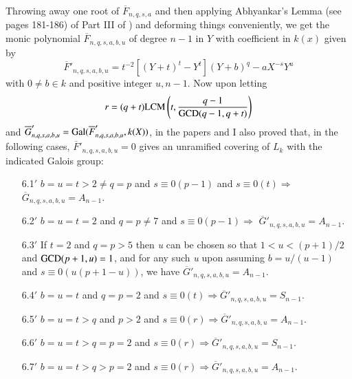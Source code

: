 Throwing away one root of $\overline{F}_{n,q,s,a}$ and then applying Abhyankar's Lemma (see pages 181-186) of Part III of \cite{art1-key4}) and deforming things conveniently, we get the monic polynomial $\overline{F}_{n,q,s,a,b,u}$ of degree $n-1$ in $Y$ with coefficient in $k(x)$ given by
$$
\overline{F}'_{n,q,s,a,b,u}=t^{-2}\left[(Y+t)^t-Y^{t}\right](Y+b)^q-aX^{-s}Y^{u}
$$
with $0 \neq b \in k$ and positive integer $u,n-1$. Now upon letting
$$
r=(q+t){\rm LCM} \left(t,\dfrac{q-1}{\operatorname{GCD} (q-1, q+t)}\right)
$$
and $\overline{G}'_{n,q,s,a,b,u} = \operatorname{Gal}(\overline{F}'_{n,q,s,a,b,u}, k(X))$, in the papers \cite{art1-key8} and \cite{art1-key10} I also proved that, in the following cases, $\overline{F}'_{n,q,s,a,b,u}=0$ gives an unramified covering of $L_{k}$ with the indicated Galois group:
\begin{itemize}
\item[{\rm 6.1$'$}]$b = u = t > 2 \neq q = p$ and $s \equiv 0(p-1)$ and $s \equiv 0(t) \Rightarrow$ $\overline{G}_{n,q,s,a,b,u} = A_{n-1}$.
\item[{\rm 6.2$'$}] $b = u = t = 2$ and $q = p \neq 7$ and $s\equiv 0(p-1) \Rightarrow$
 $\overline{G}'_{n,q,s,a,b,u} = A_{n-1}$.
\item[{\rm 6.3$'$ }] If $t =2$ and $q = p > 5$ then {\it u} can be chosen so that $1<u<(p+1)/2$ 
and $\operatorname{GCD}(p+1,u)=1$, and for any such {\it u} upon assuming
$b=u/(u-1)$ and $s \equiv 0(u(p+1-u))$, we have $\overline{G}'_{n,q,s,a,b,u} =A_{n-1}$.
\item[{\rm 6.4$'$}] $b=u=t$ and $q=p=2$ and $s\equiv 0(t) \Rightarrow \overline{G}'_{n,q,s,a,b,u} = S_{n-1}$.
\item[{\rm 6.5$'$}] $b = u = t > q$ and $p > 2$ and $s \equiv 0(r)\Rightarrow \overline{G}'_{n,q,s,a,b,u} = A_{n-1}$.
\item[{\rm 6.6$'$}] $b = u = t > q = p = 2$ and $s \equiv 0(r)\Rightarrow \overline{G}'_{n,q,s,a,b,u} = S_{n-1}$.
\item[{\rm 6.7$'$}] $b = u = t > q > p = 2$ and $s \equiv 0(r)\Rightarrow \overline{G}'_{n,q,s,a,b,u} = A_{n-1}$.
\end{itemize}

